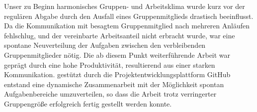 \documentclass[12pt,a4paper]{scrartcl}
\begin{document}
Unser zu Beginn harmonisches Gruppen- und Arbeitsklima wurde kurz vor der regulären Abgabe durch den Ausfall eines Gruppenmitglieds drastisch beeinflusst. Da die Kommunikation mit besagtem Gruppenmitglied nach mehreren Anläufen fehlschlug, und der vereinbarte Arbeitsanteil nicht erbracht wurde, war eine spontane Neuverteilung der Aufgaben zwischen den verbleibenden Gruppenmitglieder nötig. 
Die ab diesem Punkt weiterführende Arbeit war geprägt durch eine hohe Produktivität, resultierend aus einer starken Kommunikation.
gestützt durch die Projektentwicklungsplattform GitHub entstand eine dynamische Zusammenarbeit mit der Möglichkeit spontan Aufgabenbereiche umzuverteilen, so dass die Arbeit trotz verringerter Gruppengröße erfolgreich fertig gestellt werden konnte.
\end{document}
